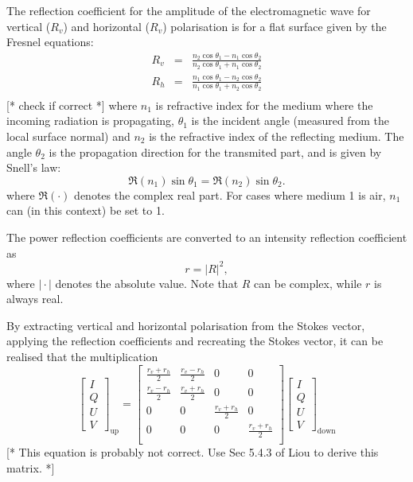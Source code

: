 The reflection coefficient for the amplitude of the electromagnetic
 wave for vertical ($R_v$) and horizontal ($R_v$) polarisation is
 for a flat surface given by the Fresnel equations:
 \begin{eqnarray}
   \label{eq:rte_fresnel}
   R_v &=& \frac{n_2\cos\theta_1-n_1\cos\theta_2}
                                           {n_2\cos\theta_1+n_1\cos\theta_2} \\
   R_h &=& \frac{n_1\cos\theta_1-n_2\cos\theta_2}
                                           {n_1\cos\theta_1+n_2\cos\theta_2} \\
 \end{eqnarray}
 [* check if correct *] where $n_1$ is refractive index for
 the medium where the incoming radiation is propagating, $\theta_1$ is
 the incident angle (measured from the local surface normal) and $n_2$
 is the refractive index of the reflecting medium. The angle
 $\theta_2$ is the propagation direction for the transmited part, and
 is given by Snell's law:
 \begin{equation}
   \label{eq:rte:snell}
   \Re(n_1)\sin\theta_1 = \Re(n_2)\sin\theta_2.
 \end{equation}
 where $\Re(\cdot)$ denotes the complex real part.
 For cases where medium 1 is air, $n_1$ can (in this context) be set to 1.
 
 The power reflection coefficients are converted to an intensity
 reflection coefficient as
 \begin{equation}
   \label{eq:rte:R2r}
   r = |R|^2,
 \end{equation}
 where $|\!\cdot\!|$ denotes the absolute value. Note that $R$ can be
 complex, while $r$ is always real.
 
 By extracting vertical and horizontal polarisation from the Stokes
 vector, applying the reflection coefficients and recreating the
 Stokes vector, it can be realised that the multiplication
 \begin{equation}
   \label{eq:rte:specular_matrix}
   \left[\begin{array}{c}I\\Q\\U\\V\end{array}\right]_\mathrm{up} =
      \left[\begin{array}{cccc}
        \frac{r_v+r_h}{2}&\frac{r_v-r_h}{2}&0&0\\
        \frac{r_v-r_h}{2}&\frac{r_v+r_h}{2}&0&0\\
        0&0&\frac{r_v+r_h}{2}&0\\
        0&0&0&\frac{r_v+r_h}{2}\\
      \end{array}
      \right]
      \left[\begin{array}{c}I\\Q\\U\\V\end{array}\right]_\mathrm{down}
 \end{equation}
 [* This equation is probably not correct. Use Sec 5.4.3 of Liou to
 derive this matrix. *]
 
